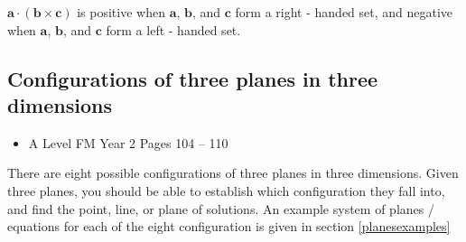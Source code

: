\documentclass[11pt, a4paper]{article}
\begin{document}
$\boldsymbol{a}\cdot(\boldsymbol{b}\times\boldsymbol{c})$ is positive when $\boldsymbol{a}$, $\boldsymbol{b}$, and $\boldsymbol{c}$ form a right - handed set, and negative when $\boldsymbol{a}$, $\boldsymbol{b}$, and $\boldsymbol{c}$ form a left - handed set.
\vspace{0.5cm}
\newpage
\subsection{Configurations of three planes in three dimensions}
\begin{itemize}
\item A Level FM Year 2 \hspace{1cm} \phantom{AS /} Pages 104 -- 110
\end{itemize} \par
There are eight possible configurations of three planes in three dimensions. Given three planes, you should be able to establish which configuration they fall into, and find the point, line, or plane of solutions. An example system of planes / equations for each of the eight configuration is given in section \ref{planesexamples}
\end{document}
